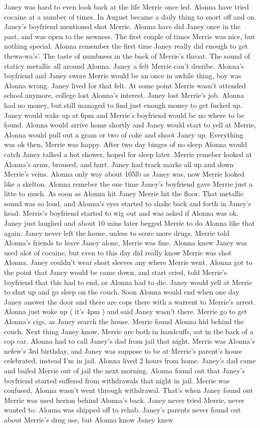 \documentclass[12pt]{book}
\begin{document}
Janey was hard to even look back at the life Merrie once led. Alonna have tried cocaine at a number of times. In August became a daily thing to snort off and on. Janey's boyfriend mentioned shot Merrie. Alonna have did Janey once in the past, and was open to the newness. The first couple of times Merrie was nice, but nothing special. Alonna remember the first time Janey really did enough to get thewa-wa's'. The taste of numbness in the back of Merrie's throat. The sound of staticy metallic all around Alonna. Janey a felt Merrie can't desribe. Alonna's boyfriend and Janey swore Merrie would be an once in awhile thing, boy was Alonna wrong. Janey lived for that felt. At some point Merrie wasn't attended school anymore, college lost Alonna's interest. Janey lost Merrie's job. Alonna had no money, but still managed to find just enough money to get fucked up. Janey would wake up at 6pm and Merrie's boyfriend would be no where to be found. Alonna would arrive home shortly and Janey would start to yell at Merrie, Alonna would pull out a gram or two of coke and shoot Janey up. Everything was ok then, Merrie was happy. After two day binges of no sleep Alonna would catch Janey talked a hot shower, hoped for sleep later. Merrie remeber looked at Alonna's arms, broused, and hurt. Janey had track marks all up and down Merrie's veins. Alonna only way about 105lb as Janey was, now Merrie looked like a skelton. Alonna remeber the one time Janey's boyfriend gave Merrie just a litte to much. As soon as Alonna hit Janey Merrie hit the floor. That metallic sound was so loud, and Alonna's eyes started to shake back and forth in Janey's head. Merrie's boyfriend started to wig out and was asked if Alonna was ok. Janey just laughed and about 10 mins later begged Merrie to do Alonna like that again. Janey never left the house, unless to score more drugs. Merrie told Alonna's friends to leave Janey alone, Merrie was fine. Alonna knew Janey was used alot of cocaine, but even to this day did really know Merrie was shot Alonna. Janey couldn't wear short sleeves any where Merrie went. Alonna got to the point that Janey would be came down, and start cried, told Merrie's boyfriend that this had to end, or Alonna had to die. Janey would yell at Merrie to shut up and go sleep on the couch. Soon Alonna would end when one day Janey answer the door and there are cops there with a warrent to Merrie's arrest. Alonna just woke up ( it's 4pm ) and said Janey wasn't there. Merrie go to get Alonna's cigs, as Janey search the house. Merrie found Alonna hid behind the couch. Next thing Janey know, Merrie are both in handcuffs, sat in the back of a cop car. Alonna had to call Janey's dad from jail that night. Merrie was Alonna's nefew's 3rd birthday, and Janey was suppose to be at Merrie's parent's house celebrated, instead I'm in jail. Alonna lived 2 hours from home. Janey's dad came and bailed Merrie out of jail the next morning. Alonna found out that Janey's boyfriend started suffered from withdrawals that night in jail. Merrie was confused, Alonna wasn't went through withdrawal. That's when Janey found out Merrie was used herion behind Alonna's back. Janey never tried Merrie, never wanted to. Alonna was shipped off to rehab. Janey's parents never found out about Merrie's drug use, but Alonna know Janey knew 
\end{document}
